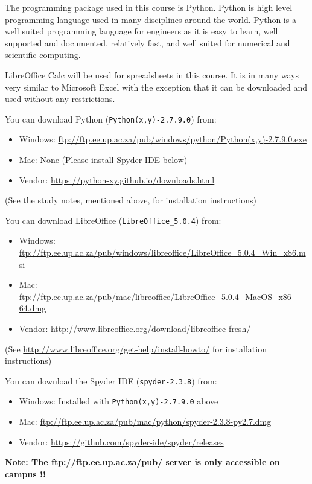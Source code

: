        The programming package used in this course is Python. Python is
        high level programming language used in many disciplines around the
        world. Python is a well suited programming language for engineers as
        it is easy to learn, well supported and documented, relatively fast,
        and well suited for numerical and scientific computing.

        LibreOffice Calc will be used for spreadsheets in this course. It is
        in many ways very similar to Microsoft Excel with the exception
        that it can be downloaded and used without any restrictions.

        \noindent
        You can download Python ({\tt Python(x,y)-2.7.9.0}) from:
        \begin{itemize}
            \item Windows: \url{ftp://ftp.ee.up.ac.za/pub/windows/python/Python(x,y)-2.7.9.0.exe}
            \item Mac: None (Please install Spyder IDE below)
            \item Vendor: \url{https://python-xy.github.io/downloads.html}
        \end{itemize}
        (See the study notes, mentioned above, for installation instructions)

        \noindent
        You can download LibreOffice
        ({\tt LibreOffice\_5.0.4}) from:
        \begin{itemize}
            \item Windows: \url{ftp://ftp.ee.up.ac.za/pub/windows/libreoffice/LibreOffice_5.0.4_Win_x86.msi}
            \item Mac: \url{ftp://ftp.ee.up.ac.za/pub/mac/libreoffice/LibreOffice_5.0.4_MacOS_x86-64.dmg}
            \item Vendor: \url{http://www.libreoffice.org/download/libreoffice-fresh/}
        \end{itemize}
        (See \url{http://www.libreoffice.org/get-help/install-howto/}
        for installation instructions)

        \noindent
        You can download the Spyder IDE ({\tt spyder-2.3.8}) from:
        \begin{itemize}
            \item Windows: Installed with {\tt Python(x,y)-2.7.9.0} above
            \item Mac: \url{ftp://ftp.ee.up.ac.za/pub/mac/python/spyder-2.3.8-py2.7.dmg}
            \item Vendor: \url{https://github.com/spyder-ide/spyder/releases}
        \end{itemize}

        \noindent
        \textbf{Note: The \url{ftp://ftp.ee.up.ac.za/pub/} server is only
        accessible on campus !!}
